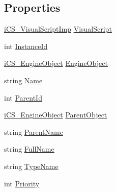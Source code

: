 \subsection*{Properties}
\begin{DoxyCompactItemize}
\item 
\hyperlink{classi_c_s___visual_script_imp}{i\+C\+S\+\_\+\+Visual\+Script\+Imp} \hyperlink{classi_c_s___object_a691ab14c3099acb192e266502ed533c2}{Visual\+Script}
\item 
int \hyperlink{classi_c_s___object_a005c8976febb3833ff3316c7e3be0bd0}{Instance\+Id}
\item 
\hyperlink{classi_c_s___engine_object}{i\+C\+S\+\_\+\+Engine\+Object} \hyperlink{classi_c_s___object_afd3476c2de8d96d0870dec9498f05d95}{Engine\+Object}
\item 
string \hyperlink{classi_c_s___object_a12fdab7b8a06cc20573eee44e8dc52be}{Name}
\item 
int \hyperlink{classi_c_s___object_a41a1200a1e5cdabe2645ff0778b2d6e2}{Parent\+Id}
\item 
\hyperlink{classi_c_s___engine_object}{i\+C\+S\+\_\+\+Engine\+Object} \hyperlink{classi_c_s___object_af737de0bca6d65d5a77ad1bc3d97666e}{Parent\+Object}
\item 
string \hyperlink{classi_c_s___object_a002230a69293573dca420fd77f233203}{Parent\+Name}
\item 
string \hyperlink{classi_c_s___object_a813b817c95554f5ada973f7775689185}{Full\+Name}
\item 
string \hyperlink{classi_c_s___object_a0cd11b091b8f806281ad5333667eca28}{Type\+Name}
\item 
int \hyperlink{classi_c_s___object_a2aab03f2a4dead4aa88c54a8018c7f8d}{Priority}
\end{DoxyCompactItemize}


